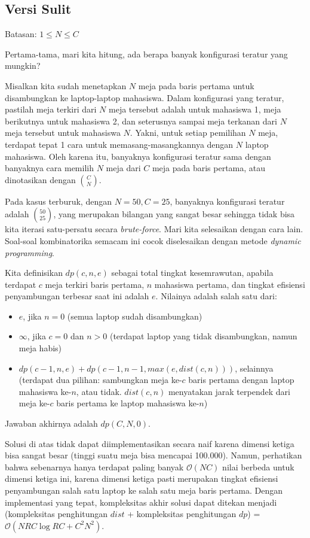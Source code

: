 \documentclass[../main_editorial.tex]{subfiles} %
\newcommand{\bigO}[1]{\mathcal{O}(#1)}
\begin{document}
\subsection*{Versi Sulit}

Batasan: $1 \le N \le C$

Pertama-tama, mari kita hitung, ada berapa banyak konfigurasi teratur yang mungkin?

Misalkan kita sudah menetapkan $N$ meja pada baris pertama untuk disambungkan ke laptop-laptop mahasiswa. Dalam konfigurasi yang teratur, pastilah meja terkiri dari $N$ meja tersebut adalah untuk mahasiswa 1, meja berikutnya untuk mahasiswa 2, dan seterusnya sampai meja terkanan dari $N$ meja tersebut untuk mahasiswa $N$. Yakni, untuk setiap pemilihan $N$ meja, terdapat tepat 1 cara untuk memasang-masangkannya dengan $N$ laptop mahasiswa. Oleh karena itu, banyaknya konfigurasi teratur sama dengan banyaknya cara memilih $N$ meja dari $C$ meja pada baris pertama, atau dinotasikan dengan $\binom{C}{N}$.

Pada kasus terburuk, dengan $N = 50, C = 25$, banyaknya konfigurasi teratur adalah $\binom{50}{25}$, yang merupakan bilangan yang sangat besar sehingga tidak bisa kita iterasi satu-persatu secara \textit{brute-force}. Mari kita selesaikan dengan cara lain. Soal-soal kombinatorika semacam ini cocok diselesaikan dengan metode \textit{dynamic programming}.

Kita definisikan $dp(c, n, e)$ sebagai total tingkat kesemrawutan, apabila terdapat $c$ meja terkiri baris pertama, $n$ mahasiswa pertama, dan tingkat efisiensi penyambungan terbesar saat ini adalah $e$. Nilainya adalah salah satu dari:

\begin{itemize}
    \item $e$, jika  $n = 0$ (semua laptop sudah disambungkan)
    \item $\infty$, jika  $c = 0$ dan $n > 0$ (terdapat laptop yang tidak disambungkan, namun meja habis)
    \item $dp(c-1, n, e) + dp(c-1, n-1, max(e, dist(c, n)))$, selainnya (terdapat dua pilihan: sambungkan meja ke-$c$ baris pertama dengan laptop mahasiswa ke-$n$, atau tidak. $dist(c, n)$ menyatakan jarak terpendek dari meja ke-$c$ baris pertama ke laptop mahasiswa ke-$n$)
\end{itemize}

Jawaban akhirnya adalah $dp(C, N, 0)$.

Solusi di atas tidak dapat diimplementasikan secara naif karena dimensi ketiga bisa sangat besar (tinggi suatu meja bisa mencapai 100.000). Namun, perhatikan bahwa sebenarnya hanya terdapat paling banyak $\bigO{NC}$ nilai berbeda untuk dimensi ketiga ini, karena dimensi ketiga pasti merupakan tingkat efisiensi penyambungan salah satu laptop ke salah satu meja baris pertama. Dengan implementasi yang tepat, kompleksitas akhir solusi dapat ditekan menjadi (kompleksitas penghitungan $dist$ + kompleksitas penghitungan $dp$) = $\bigO{NRC \log RC + C^{2} N^{2}}$.
\end{document}
